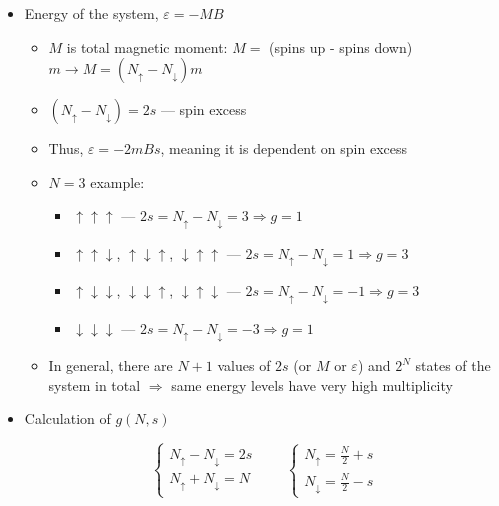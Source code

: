 \begin{itemize}
\begin{itemize}
      \item Energy of the system, $\varepsilon=-MB$

        \begin{itemize}

            \item $M$ is total magnetic moment: $M=$ (spins up - spins down)$m\rightarrow M=\left( N_{\uparrow}-N_{\downarrow} \right)m$

            \item $(N_{\uparrow}-N_{\downarrow})=2s$ — spin excess

            \item Thus, $\varepsilon=-2mBs$, meaning it is dependent on spin excess

            \item $N=3$ example:

              \begin{itemize}

                \item $\uparrow\uparrow\uparrow$ — $2s=N_{\uparrow}-N_{\downarrow}=3\Rightarrow g=1$

                \item $\uparrow\uparrow\downarrow$, $\uparrow\downarrow\uparrow$, $\downarrow\uparrow\uparrow$ — $2s=N_{\uparrow}-N_{\downarrow}=1\Rightarrow g=3$

                \item $\uparrow\downarrow\downarrow$, $\downarrow\downarrow\uparrow$, $\downarrow\uparrow\downarrow$ — $2s=N_{\uparrow}-N_{\downarrow}=-1\Rightarrow g=3$

                \item $\downarrow\downarrow\downarrow$ — $2s=N_{\uparrow}-N_{\downarrow}=-3\Rightarrow g=1$

              \end{itemize}

            \item In general, there are $N+1$ values of $2s$ (or $M$ or $\varepsilon$) and $2^N$ states of the system in total $\Rightarrow$ same energy levels have very high multiplicity

        \end{itemize}

      \item Calculation of $g(N,s)$

        $$\left\{\begin{array}{l} N_{\uparrow}-N_{\downarrow}=2s\\N_{\uparrow}+N_{\downarrow}=N\end{array}\quad\quad\left\{\begin{array}{l} N_{\uparrow}=\frac{N}{2}+s\\N_{\downarrow}=\frac{N}{2}-s\end{array}$$


\end{itemize}
\end{itemize}
